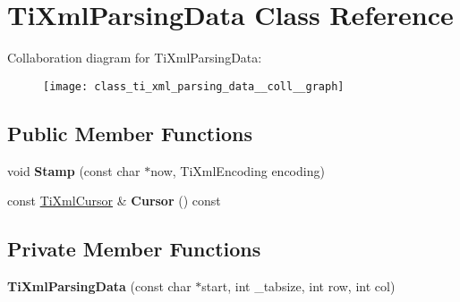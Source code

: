 \hypertarget{class_ti_xml_parsing_data}{\section{\-Ti\-Xml\-Parsing\-Data \-Class \-Reference}
\label{class_ti_xml_parsing_data}
}


\-Collaboration diagram for \-Ti\-Xml\-Parsing\-Data\-:\nopagebreak
\begin{figure}[H]
\begin{center}
\leavevmode
\texttt{[image: class\_ti\_xml\_parsing\_data\_\_coll\_\_graph]}
\end{center}
\end{figure}
\subsection*{\-Public \-Member \-Functions}
\begin{DoxyCompactItemize}
\item 
\hypertarget{class_ti_xml_parsing_data_a65cee8ab77a36c605db08c84b4c30a7d}{void {\bfseries \-Stamp} (const char $\ast$now, \-Ti\-Xml\-Encoding encoding)}\label{class_ti_xml_parsing_data_a65cee8ab77a36c605db08c84b4c30a7d}

\item 
\hypertarget{class_ti_xml_parsing_data_a9e63d965fdb53ff4ac711e105269e918}{const \hyperlink{struct_ti_xml_cursor}{\-Ti\-Xml\-Cursor} \& {\bfseries \-Cursor} () const }\label{class_ti_xml_parsing_data_a9e63d965fdb53ff4ac711e105269e918}

\end{DoxyCompactItemize}
\subsection*{\-Private \-Member \-Functions}
\begin{DoxyCompactItemize}
\item 
\hypertarget{class_ti_xml_parsing_data_aa5beaf71579a91d6942277f417899ab9}{{\bfseries \-Ti\-Xml\-Parsing\-Data} (const char $\ast$start, int \-\_\-tabsize, int row, int col)}\label{class_ti_xml_parsing_data_aa5beaf71579a91d6942277f417899ab9}

\end{DoxyCompactItemize}
